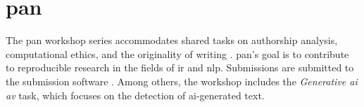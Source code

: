 \section{\acs{pan}}
\label{sec:pan}

The \ac{pan} workshop series accommodates shared tasks %
on authorship analysis, computational ethics, and the originality of writing \cite{ayele_overview_2024}.
\ac{pan}'s goal is to contribute to reproducible research in the fields of \ac{ir} and \ac{nlp}.
Submissions are submitted to the submission software \tira{}.
Among others, the workshop includes the \textit{Generative \ac{ai} \ac{av}} task, 
which focuses on the detection of \ac{ai}-generated text.
